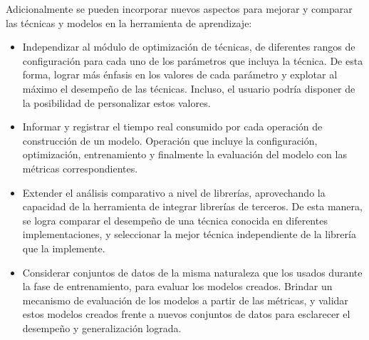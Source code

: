Adicionalmente se pueden incorporar nuevos aspectos para mejorar y
comparar las técnicas y modelos en la herramienta de aprendizaje: 
\begin{itemize}
\item Independizar al módulo de optimización de técnicas, de diferentes
rangos de configuración para cada uno de los parámetros que incluya
la técnica. De esta forma, lograr más énfasis en los valores de cada
parámetro y explotar al máximo el desempeño de las técnicas. Incluso,
el usuario podría disponer de la posibilidad de personalizar estos
valores.
\item Informar y registrar el tiempo real consumido por cada operación de
construcción de un modelo. Operación que incluye la configuración,
optimización, entrenamiento y finalmente la evaluación del modelo
con las métricas correspondientes. 
\item Extender el análisis comparativo a nivel de librerías, aprovechando
la capacidad de la herramienta de integrar librerías de terceros.
De esta manera, se logra comparar el desempeño de una técnica conocida
en diferentes implementaciones, y seleccionar la mejor técnica independiente
de la librería que la implemente. 
\item Considerar conjuntos de datos de la misma naturaleza que los usados
durante la fase de entrenamiento, para evaluar los modelos creados.
Brindar un mecanismo de evaluación de los modelos a partir de las
métricas, y validar estos modelos creados frente a nuevos conjuntos
de datos para esclarecer el desempeño y generalización lograda. \end{itemize}


